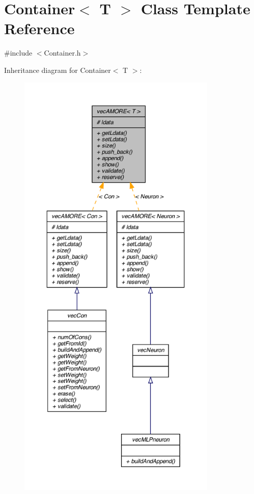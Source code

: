 \hypertarget{classvec_a_m_o_r_e}{
\section{Container$<$ T $>$ Class Template Reference}
\label{classvec_a_m_o_r_e}
}


{\ttfamily \#include $<$Container.h$>$}



Inheritance diagram for Container$<$ T $>$:
\nopagebreak
\begin{figure}[H]
\begin{center}
\leavevmode
\includegraphics[height=600pt]{classvec_a_m_o_r_e__inherit__graph}
\end{center}
\end{figure}


